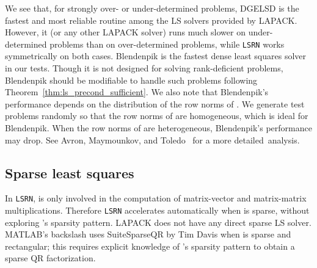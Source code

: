 \documentclass{siamltex}
\begin{document}
We see that, for strongly over- or under-determined problems, DGELSD is the
fastest and most reliable routine among the LS solvers provided by
LAPACK. However, it (or any other LAPACK solver) runs much slower on
under-determined problems than on over-determined problems, while \texttt{LSRN}
works symmetrically on both cases.  Blendenpik is the fastest dense least
squares solver in our tests. Though it is not designed for solving
rank-deficient problems, Blendenpik should be modifiable to handle such problems
following Theorem~\ref{thm:ls_precond_sufficient}.  We also note that
Blendenpik's performance depends on the distribution of the row norms of . We
generate test problems randomly so that the row norms of  are homogeneous,
which is ideal for Blendenpik. When the row norms of  are heterogeneous,
Blendenpik's performance may drop.  See Avron, Maymounkov, and
Toledo~\cite{avron2010blendenpik} for a more detailed~analysis.

\subsection{Sparse least squares}
\label{sec:sparse-lsq}

In \texttt{LSRN},  is only involved in the computation of matrix-vector and
matrix-matrix multiplications. Therefore \texttt{LSRN} accelerates automatically
when  is sparse, without exploring 's sparsity pattern. LAPACK does not
have any direct sparse LS solver. MATLAB's backslash uses SuiteSparseQR by Tim
Davis \cite{davis2008algorithm} when  is sparse and rectangular; this
requires explicit knowledge of 's sparsity pattern to obtain a sparse QR
factorization.
\end{document}
